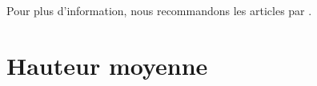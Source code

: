 
Pour plus d'information, nous recommandons les articles par
\citet*{DershwowitzZaks_1980,DershowitzZaks_1981,DershowitzZaks_1990}.

\section{Hauteur moyenne}
\label{sec:Catalan_height}

